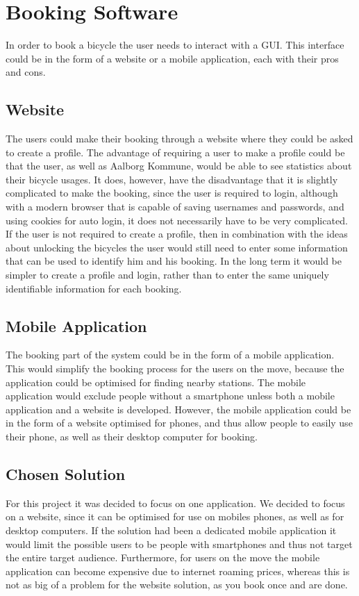 \section{Booking Software}
In order to book a bicycle the user needs to interact with a GUI.
This interface could be in the form of a website or a mobile application, each with their pros and cons.

\subsection{Website}
The users could make their booking through a website where they could be asked to create a profile.
The advantage of requiring a user to make a profile could be that the user, as well as Aalborg Kommune, would be able to see statistics about their bicycle usages.
It does, however, have the disadvantage that it is slightly complicated to make the booking, since the user is required to login, although with a modern browser that is capable of saving usernames and passwords, and using cookies for auto login, it does not necessarily have to be very complicated.
If the user is not required to create a profile, then in combination with the ideas about unlocking the bicycles the user would still need to enter some information that can be used to identify him and his booking.
In the long term it would be simpler to create a profile and login, rather than to enter the same uniquely identifiable information for each booking.

\subsection{Mobile Application}
The booking part of the system could be in the form of a mobile application. 
This would simplify the booking process for the users on the move, because the application could be optimised for finding nearby stations.
The mobile application would exclude people without a smartphone unless both a mobile application and a website is developed.
However, the mobile application could be in the form of a website optimised for phones, and thus allow people to easily use their phone, as well as their desktop computer for booking. 

\subsection{Chosen Solution}
For this project it was decided to focus on one application.
We decided to focus on a website, since it can be optimised for use on mobiles phones, as well as for desktop computers. 
If the solution had been a dedicated mobile application it would limit the possible users to be people with smartphones and thus not target the entire target audience.
Furthermore, for users on the move the mobile application can become expensive due to internet roaming prices, whereas this is not as big of a problem for the website solution, as you book once and are done.

